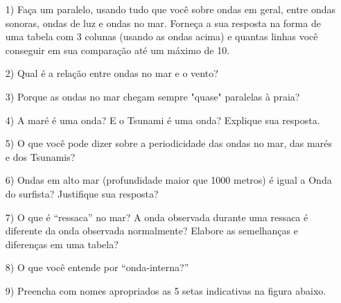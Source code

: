 \documentclass[a4paper,10pt]{article}
\begin{document}
    \begin{itemize}
      \item[1)] Faça um paralelo, usando tudo que você sobre ondas em geral, entre
            ondas sonoras, ondas de luz e ondas no mar.  Forneça a sua resposta
            na forma de uma tabela com 3 colunas (usando as ondas acima) e
            quantas linhas você conseguir em sua comparação até um máximo de 10.
      \item[2)] Qual é a relação entre ondas no mar e o vento?
      \item[3)] Porque as ondas no mar chegam sempre "quase" paralelas à praia?
      \item[4)] A maré é uma onda?  E o Tsunami é uma onda?  Explique sua resposta.
      \item[5)] O que você pode dizer sobre a periodicidade das ondas no mar, das
            marés e dos Tsunamis?
      \item[6)] Ondas em alto mar (profundidade maior que 1000 metros) é igual a
            Onda do surfista?  Justifique sua resposta?
      \item[7)] O que é ``ressaca'' no mar?  A onda observada durante uma ressaca é
            diferente da onda observada normalmente?  Elabore as semelhanças e
            diferenças em uma tabela?
      \item[8)] O que você entende por ``onda-interna?''

      \item[9)] Preencha com nomes apropriados as 5 setas indicativas na figura
            abaixo.


\end{itemize}
\end{document}
